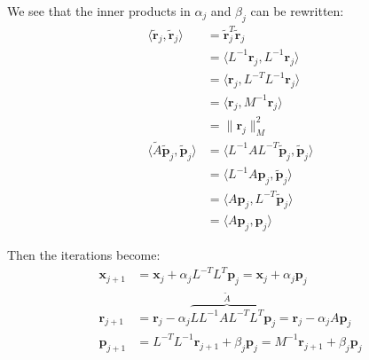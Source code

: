 We see that the inner products in $\alpha_j$ and $\beta_j$ can be rewritten:
\begin{align*}
    \langle \tilde{\mathbf{r}}_j, \tilde{\mathbf{r}}_j \rangle           & = \tilde{\mathbf{r}}_j^T \tilde{\mathbf{r}}_j                                \\
                                                                         & = \langle L^{-1} \mathbf{r}_j, L^{-1} \mathbf{r}_j \rangle                   \\
                                                                         & = \langle \mathbf{r}_j, L^{-T} L^{-1} \mathbf{r}_j \rangle                   \\
                                                                         & = \langle \mathbf{r}_j, M^{-1} \mathbf{r}_j \rangle                          \\
                                                                         & = \|\mathbf{r}_j\|_M^2                                                       \\
    \langle \tilde{A} \tilde{\mathbf{p}}_j, \tilde{\mathbf{p}}_j \rangle & = \langle L^{-1} A L^{-T} \tilde{\mathbf{p}}_j, \tilde{\mathbf{p}}_j \rangle \\
                                                                         & = \langle L^{-1} A \mathbf{p}_j, \tilde{\mathbf{p}}_j \rangle                \\
                                                                         & = \langle A \mathbf{p}_j, L^{-T} \tilde{\mathbf{p}}_j \rangle                \\
                                                                         & = \langle A \mathbf{p}_j, \mathbf{p}_j \rangle
\end{align*}

Then the iterations become:
\begin{align*}
    \mathbf{x}_{j+1} & = \mathbf{x}_j + \alpha_j L^{-T} L^T \mathbf{p}_j = \mathbf{x}_j + \alpha_j \mathbf{p}_j                                      \\
    \mathbf{r}_{j+1} & = \mathbf{r}_j - \alpha_j \overbrace{L L^{-1} A L^{-T} L^T}^{\tilde{A}} \mathbf{p}_j = \mathbf{r}_j - \alpha_j A \mathbf{p}_j \\
    \mathbf{p}_{j+1} & = L^{-T} L^{-1} \mathbf{r}_{j+1} + \beta_j \mathbf{p}_j = M^{-1} \mathbf{r}_{j+1} + \beta_j \mathbf{p}_j
\end{align*}

